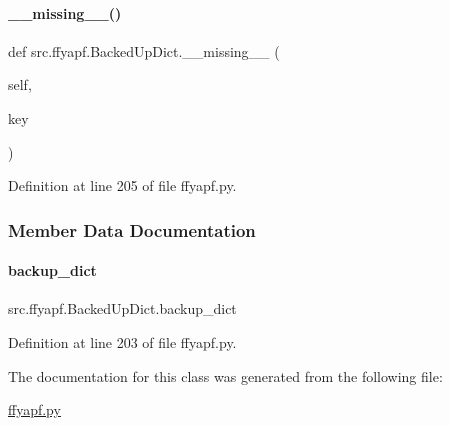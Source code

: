 \paragraph{\texorpdfstring{\+\_\+\+\_\+missing\+\_\+\+\_\+()}{\_\_missing\_\_()}}
{\footnotesize\ttfamily def src.\+ffyapf.\+Backed\+Up\+Dict.\+\_\+\+\_\+missing\+\_\+\+\_\+ (\begin{DoxyParamCaption}\item[{}]{self,  }\item[{}]{key }\end{DoxyParamCaption})}



Definition at line 205 of file ffyapf.\+py.



\subsubsection{Member Data Documentation}
\mbox{\label{classsrc_1_1ffyapf_1_1BackedUpDict_a431ca6a61be2b6eafaed4f6611c2e149}} 
\paragraph{\texorpdfstring{backup\+\_\+dict}{backup\_dict}}
{\footnotesize\ttfamily src.\+ffyapf.\+Backed\+Up\+Dict.\+backup\+\_\+dict}



Definition at line 203 of file ffyapf.\+py.



The documentation for this class was generated from the following file\+:\begin{DoxyCompactItemize}
\item 
\hyperlink{ffyapf_8py}{ffyapf.\+py}\end{DoxyCompactItemize}
